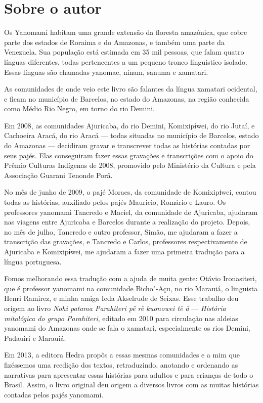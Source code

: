 
\section{Sobre o autor}

Os Yanomami habitam uma grande extensão da floresta amazônica, que cobre
parte dos estados de Roraima e do Amazonas, e também uma parte da
Venezuela. Sua população está estimada em 35 mil pessoas, que falam
quatro línguas diferentes, todas pertencentes a um pequeno tronco
linguístico isolado. Essas línguas são chamadas yanomae, ninam, sanuma e
xamatari.

As comunidades de onde veio este livro são falantes da língua xamatari
ocidental, e ficam no município de Barcelos, no estado do Amazonas, na
região conhecida como Médio Rio Negro, em torno do rio Demini. 
 
Em 2008, as comunidades Ajuricaba, do rio Demini, Komixipɨwei, do rio
Jutaí, e Cachoeira Aracá, do rio Aracá --- todas situadas no município
de Barcelos, estado do Amazonas --- decidiram gravar e transcrever todas
as histórias contadas por seus pajés. Elas conseguiram fazer essas
gravações e transcrições com o apoio do Prêmio Culturas Indígenas de
2008, promovido pelo Ministério da Cultura e pela Associação Guarani
Tenonde Porã.

No mês de junho de 2009, o pajé Moraes, da comunidade de Komixipɨwei,
contou todas as histórias, auxiliado pelos pajés Mauricio, Romário e
Lauro. Os professores yanomami Tancredo e Maciel, da comunidade de
Ajuricaba, ajudaram nas viagens entre Ajuricaba e Barcelos durante a
realização do projeto. Depois, no mês de julho, Tancredo e outro
professor, Simão, me ajudaram a fazer a transcrição das gravações, e
Tancredo e Carlos, professores respectivamente de Ajuricaba e
Komixipɨwei, me ajudaram a fazer uma primeira tradução para a língua
portuguesa.  

Fomos melhorando essa tradução com a ajuda de muita gente: Otávio
Ironasiteri, que é professor yanomami na comunidade Bicho"-Açu, no rio
Marauiá, o linguista Henri Ramirez, e minha amiga Ieda Akselrude de
Seixas. Esse trabalho deu origem ao livro \emph{Nohi patama Parahiteri
pë rë kuonowei të ã} --- \emph{História mitológica do grupo Parahiteri},
editado em 2010 para circulação nas aldeias yanomami do Amazonas onde se
fala o xamatari, especialmente os rios Demini, Padauiri e Marauiá. 
 
Em 2013, a editora Hedra propôs a essas mesmas comunidades e a mim que
fizéssemos uma reedição dos textos, retraduzindo, anotando e ordenando as
narrativas para apresentar essas histórias para adultos e para crianças de todo
o Brasil. Assim, o livro original deu origem a diversos livros com as muitas
histórias contadas pelos pajés yanomami.  


